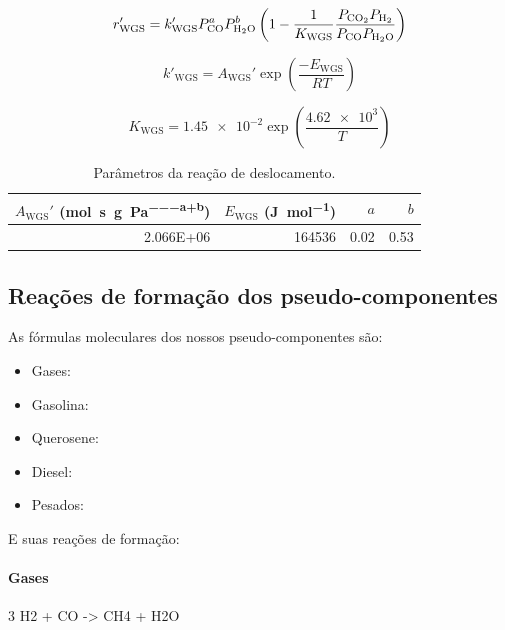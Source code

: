 \documentclass[portuguese,12pt,a4paper,onecolumn]{article}
\begin{document}
	\begin{equation}
		r_\mathrm{WGS}' = k_{\mathrm{WGS}}' P_{\ce{CO}}^a P_{\ce{H2O}}^b  \left(1 - \frac{1}{K_{\mathrm{WGS}}} \frac{P_{\ce{CO2}} P_{\ce{H2}}}{P_{\ce{CO}} P_{\ce{H2O}}} \right)
		\label{eq:rate_CO2_2}
	\end{equation}
	
	\begin{equation}
		k'_\mathrm{WGS} = A_\mathrm{WGS}' \exp \left( \frac{-E_\mathrm{WGS}}{RT} \right)
		\label{eq:k_WGS_2}
	\end{equation}
	
	\begin{equation}
		K_{\mathrm{WGS}} = \num{1.45e-2} \exp \left( \frac{\num{4.62e3}}{T} \right)
		\label{eq:K_WGS_2}
	\end{equation}
	
	\begin{table}[!h]
		\centering
		\caption{Parâmetros da reação de deslocamento.}
		\label{tab:params_WGS_2}
			\begin{tabular}{rrrr}
				\toprule
				$A_{\mathrm{WGS}}'$ (\unit{\mole \per \second \per \gram \per \pascal^{a+b}}) & $E_{\mathrm{WGS}}$ (\unit{\joule \per \mole}) & $a$ & $b$ \\
				\midrule
				\num{2.066E+06} & \num{164536} & \num{0.02} & \num{0.53} \\
				\bottomrule
			\end{tabular}%
	\end{table}
	
	\subsection{Reações de formação dos pseudo-componentes}
	
	As fórmulas moleculares dos nossos pseudo-componentes são:

	\begin{itemize}
		\item Gases: 
		\item Gasolina: 
		\item Querosene: 
		\item Diesel: 
		\item Pesados: 
	\end{itemize}
	
	E suas reações de formação:
	
	\paragraph{Gases}
	\begin{reaction}
		3 H2 + CO -> CH4 + H2O
		\label{reac:gases_2}
	\end{reaction}
	
\end{document}
